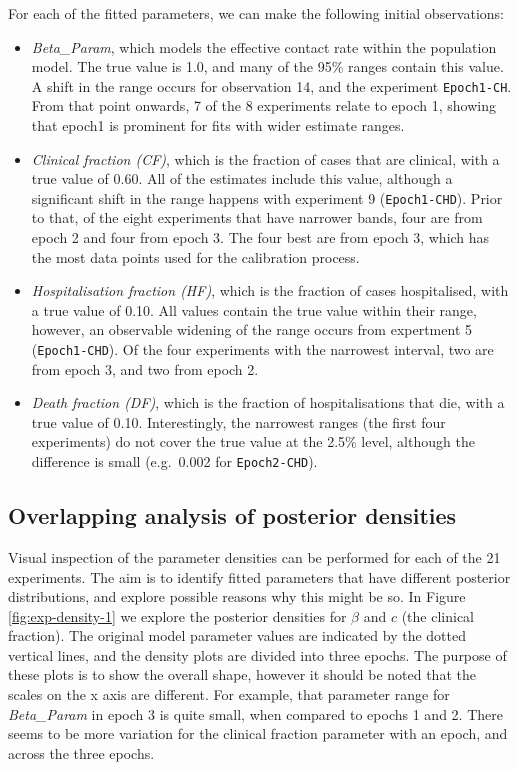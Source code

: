 \documentclass[10pt,letterpaper]{article}
\begin{document}
For each of the fitted parameters, we can make the following initial observations:

\begin{itemize}
\item
  \emph{Beta\_Param}, which models the effective contact rate within the population model. The true value is 1.0, and many of the 95\% ranges contain this value. A shift in the range occurs for observation 14, and the experiment \texttt{Epoch1-CH}. From that point onwards, 7 of the 8 experiments relate to epoch 1, showing that epoch1 is prominent for fits with wider estimate ranges.
\item
  \emph{Clinical fraction (CF)}, which is the fraction of cases that are clinical, with a true value of 0.60. All of the estimates include this value, although a significant shift in the range happens with experiment 9 (\texttt{Epoch1-CHD}). Prior to that, of the eight experiments that have narrower bands, four are from epoch 2 and four from epoch 3. The four best are from epoch 3, which has the most data points used for the calibration process.
\item
  \emph{Hospitalisation fraction (HF)}, which is the fraction of cases hospitalised, with a true value of 0.10. All values contain the true value within their range, however, an observable widening of the range occurs from expertment 5 (\texttt{Epoch1-CHD}). Of the four experiments with the narrowest interval, two are from epoch 3, and two from epoch 2.
\item
  \emph{Death fraction (DF)}, which is the fraction of hospitalisations that die, with a true value of 0.10. Interestingly, the narrowest ranges (the first four experiments) do not cover the true value at the 2.5\% level, although the difference is small (e.g.~0.002 for \texttt{Epoch2-CHD}).
\end{itemize}

\hypertarget{overlapping-analysis-of-posterior-densities}{%
\subsection{Overlapping analysis of posterior densities}\label{overlapping-analysis-of-posterior-densities}}

Visual inspection of the parameter densities can be performed for each of the 21 experiments. The aim is to identify fitted parameters that have different posterior distributions, and explore possible reasons why this might be so. In Figure \ref{fig:exp-density-1} we explore the posterior densities for \(\beta\) and \(c\) (the clinical fraction). The original model parameter values are indicated by the dotted vertical lines, and the density plots are divided into three epochs. The purpose of these plots is to show the overall shape, however it should be noted that the scales on the x axis are different. For example, that parameter range for \emph{Beta\_Param} in epoch 3 is quite small, when compared to epochs 1 and 2. There seems to be more variation for the clinical fraction parameter with an epoch, and across the three epochs.
\end{document}
